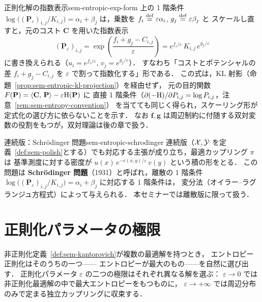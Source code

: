 \begin{remark}{正則化解の指数表示}{sem-entropic-exp-form}
  上の 1 階条件 $\log\bigl((\mathbf{P}_\varepsilon)_{i,j}/K_{i,j}\bigr) = \alpha_i + \beta_j$ は，乗数を $f_i \overset{\mathrm{def}}{=} \varepsilon\alpha_i$, $g_j \overset{\mathrm{def}}{=} \varepsilon\beta_j$ と
  スケールし直すと，元のコスト $\mathbf{C}$ を用いた指数表示
  \[
    (\mathbf{P}_\varepsilon)_{i,j}
    = \exp\!\left(\frac{f_i + g_j - C_{i,j}}{\varepsilon}\right)
    = e^{f_i / \varepsilon}\, K_{i,j}\, e^{g_j / \varepsilon}
  \]
  に書き換えられる（$u_i = e^{f_i / \varepsilon}$, $v_j = e^{g_j / \varepsilon}$）．
  すなわち「コストとポテンシャルの差 $f_i + g_j - C_{i,j}$ を $\varepsilon$ で割って指数化する」形である．
  この式は，KL 射影（命題~\ref{prop:sem-entropic-kl-projection}）を経由せず，
  元の目的関数 $F(\mathbf{P}) = \langle \mathbf{C},\, \mathbf{P} \rangle - \varepsilon\mathrm{H}(\mathbf{P})$ に
  直接 1 階条件（$\partial(-\mathrm{H})/\partial P_{i,j} = \log P_{i,j}$，注意~\ref{rem:sem-entropy-convention}）
  を当てても同じく得られ，スケーリング形が定式化の選び方に依らないことを示す．
  なお $\mathbf{f}, \mathbf{g}$ は周辺制約に付随する双対変数の役割をもつが，双対理論は後の章で扱う．
\end{remark}

\begin{remark}{連続版：Schr\"odinger 問題}{sem-entropic-schrodinger}
  連続版（$\mathcal{X}, \mathcal{Y}$ を定義~\ref{def:sem-polish}とする）でも対応する主張が成り立ち，最適カップリング $\pi$ は
  基準測度に対する密度が $u(x)\, e^{-c(x,y)/\varepsilon}\, v(y)$ という積の形をとる．
  この問題は \textbf{Schr\"odinger 問題}（1931）と呼ばれ，離散の 1 階条件
  $\log\bigl((\mathbf{P}_\varepsilon)_{i,j} / K_{i,j}\bigr) = \alpha_i + \beta_j$ に対応する 1 階条件は，
  変分法（オイラー–ラグランジュ方程式）によって与えられる．
  本セミナーでは離散版に限って扱う．
\end{remark}

\section{正則化パラメータの極限}
\label{sec:sem-epsilon-limits}

非正則化定義~\ref{def:sem-kantorovich}が複数の最適解を持つとき，
エントロピー正則化はそのうちの一つ——
エントロピーが最大のもの——を自然に選び出す．
正則化パラメータ $\varepsilon$ の二つの極限はそれぞれ異なる解を選ぶ：
$\varepsilon \to 0$ では非正則化最適解の中で最大エントロピーをもつものに，
$\varepsilon \to +\infty$ では周辺分布のみで定まる独立カップリングに収束する．

